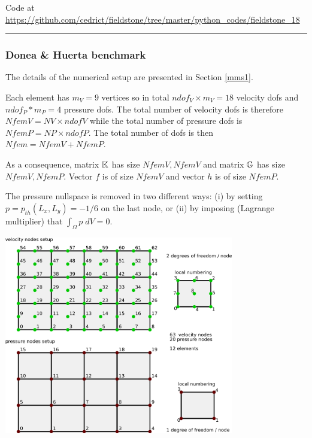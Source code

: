 

\begin{center}
Code at \url{https://github.com/cedrict/fieldstone/tree/master/python_codes/fieldstone_18}
\end{center}

\par\noindent\rule{\textwidth}{0.4pt}

\subsubsection*{Donea \& Huerta benchmark}
The details of the numerical setup are presented in Section \ref{mms1}.

Each element has $m_V=9$ vertices so in total $ndof_V\times m_V=18$ velocity dofs and 
$ndof_P*m_P=4$ pressure dofs. The total number of 
velocity dofs is therefore $NfemV=NV \times ndofV$ while the total number of
pressure dofs is $NfemP=NP\times ndofP$. The total number of dofs is then $Nfem=NfemV+NfemP$.

As a consequence, matrix ${\mathbb{K}}$ has size $NfemV,NfemV$ and matrix ${\mathbb{G}}$ has size $NfemV,NfemP$.
Vector $f$ is of size $NfemV$ and vector $h$ is of size $NfemP$.  

The pressure nullspace is removed in two different ways:
(i) by setting $p=p_{th}(L_x,L_y)=-1/6$ on the last node, or (ii)
by imposing (Lagrange multiplier) that $\int_\Omega p \; dV=0$.

\begin{center}
\includegraphics[width=10cm]{python_codes/fieldstone_18/images/q2q1setup}
\end{center}

